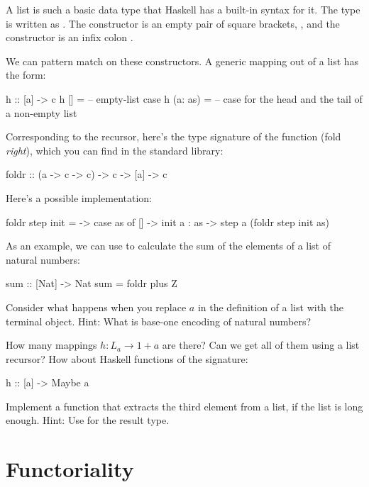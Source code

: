 \documentclass[DaoFP]{subfiles}
\begin{document}
A list is such a basic data type that Haskell has a built-in syntax for it. The type  is written as \hask{[a]}. The  constructor is an empty pair of square brackets, \hask{[]}, and the  constructor is an infix colon \hask{:}.

We can pattern match on these constructors. A generic mapping out of a list has the form:
\begin{haskell}
h :: [a] -> c
h []      = -- empty-list case
h (a: as) = -- case for the head and the tail of a non-empty list
\end{haskell}

Corresponding to the recursor, here's the type signature of the function  (fold \emph{right}), which you can find in the standard library:
\begin{haskell}
foldr :: (a -> c -> c) -> c -> [a] -> c
\end{haskell}
Here's a possible implementation:
\begin{haskell}
foldr step init = \as ->
  case as of
    [] -> init
    a : as -> step a (foldr step init as)
\end{haskell}

As an example, we can use  to calculate the sum of the elements of a list of natural numbers:
\begin{haskell}
sum :: [Nat] -> Nat
sum = foldr plus Z
\end{haskell}


\begin{exercise}
Consider what happens when you replace $a$ in the definition of a list with the terminal object. Hint: What is base-one encoding of natural numbers?
\end{exercise}
\begin{exercise}
How many mappings $h \colon L_a \to 1 + a$ are there? Can we get all of them using a list recursor? How about Haskell functions of the signature:
\begin{haskell}
h :: [a] -> Maybe a
\end{haskell}
\end{exercise}
\begin{exercise}
Implement a function that extracts the third element from a list, if the list is long enough. Hint: Use  for the result type.
\end{exercise}

\section{Functoriality}
\end{document}
